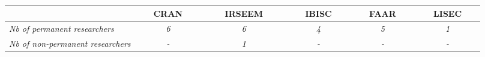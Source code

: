 \documentclass[a4paper,11pt]{article}
\begin{document}
\begin{table}[h!]
\scriptsize
\begin{center}
\renewcommand{\arraystretch}{1.}
\begin{tabular}{p{6cm}rrrrr}
\multicolumn{1}{c}{} & \multicolumn{1}{c}{\bf~~~CRAN~~~} & \multicolumn{1}{c}{\bf~~~~IRSEEM~~~~} &  \multicolumn{1}{c}{\bf~~~IBISC~~~} &  \multicolumn{1}{c}{\bf~~~FAAR~~~} &  \multicolumn{1}{c}{\bf~~~LISEC~~~}\\
\hline 
\multicolumn{1}{l}{\it Nb of permanent researchers} & \multicolumn{1}{c}{\it~~~6~~~} & \multicolumn{1}{c}{\it~~~~6~~~~} & \multicolumn{1}{c}{\it~~~4~~~} & \multicolumn{1}{c}{\it~~~5~~~} & \multicolumn{1}{c}{\it~~~1~~~}\\
\multicolumn{1}{l}{\it Nb of non-permanent researchers} & \multicolumn{1}{c}{\it~~~-~~~} & \multicolumn{1}{c}{\it~~~~1~~~~} & \multicolumn{1}{c}{\it~~~-~~~} & \multicolumn{1}{c}{\it~~~-~~~} & \multicolumn{1}{c}{\it~~~-~~~}\\
\hline \hline


\end{tabular}
\end{center}
\end{table}
\end{document}
